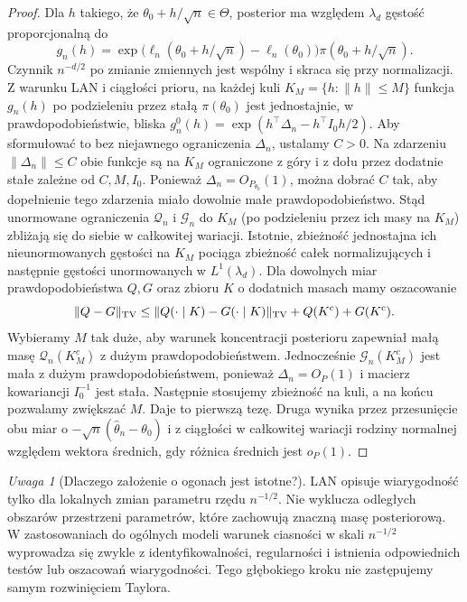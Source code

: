 \documentclass[11pt,a4paper,oneside]{report}
\numberwithin{equation}{chapter}
\theoremstyle{plain}
\theoremstyle{definition}
\theoremstyle{remark}
\newtheorem{uwaga}{Uwaga}[chapter]
\newcommand{\norm}[1]{\lVert#1\rVert}
\begin{document}
\begin{proof}
Dla $h$ takiego, że $\theta_0+h/\sqrt n\in\Theta$,
posterior ma względem $\lambda_d$ gęstość proporcjonalną do
\[
 g_n(h)=\exp\big(\ell_n(\theta_0+h/\sqrt n)-\ell_n(\theta_0)\big)
 \pi(\theta_0+h/\sqrt n).
\]
Czynnik $n^{-d/2}$ po zmianie zmiennych jest wspólny
i skraca się przy normalizacji.
Z warunku LAN i ciągłości prioru, na każdej kuli
$K_M=\{h:\norm h\le M\}$ funkcja $g_n(h)$
po podzieleniu przez stałą $\pi(\theta_0)$ jest
jednostajnie, w prawdopodobieństwie, bliska
$g_n^0(h)=\exp(h^\top\Delta_n-h^\top I_0h/2)$.
Aby sformułować to bez niejawnego ograniczenia $\Delta_n$,
ustalamy $C>0$. Na zdarzeniu $\norm{\Delta_n}\le C$
obie funkcje są na $K_M$ ograniczone z góry i z dołu
przez dodatnie stałe zależne od $C,M,I_0$.
Ponieważ $\Delta_n=O_{P_{\theta_0}}(1)$,
można dobrać $C$ tak, aby dopełnienie tego zdarzenia
miało dowolnie małe prawdopodobieństwo.
Stąd unormowane ograniczenia $\mathcal Q_n$ i $\mathcal G_n$
do $K_M$ (po podzieleniu przez ich masy na $K_M$)
zbliżają się do siebie w całkowitej wariacji.
Istotnie, zbieżność jednostajna ich nieunormowanych
gęstości na $K_M$ pociąga zbieżność całek normalizujących
i następnie gęstości unormowanych w $L^1(\lambda_d)$.
Dla dowolnych miar prawdopodobieństwa $Q,G$ oraz zbioru
$K$ o dodatnich masach mamy oszacowanie
\[
 \norm{Q-G}_{\rm TV}
 \le \norm{Q(\cdot\mid K)-G(\cdot\mid K)}_{\rm TV}
       +Q(K^c)+G(K^c).
\]
Wybieramy $M$ tak duże, aby warunek koncentracji posterioru
zapewniał małą masę $\mathcal Q_n(K_M^c)$ z dużym
prawdopodobieństwem. Jednocześnie
$\mathcal G_n(K_M^c)$ jest mała z dużym prawdopodobieństwem,
ponieważ $\Delta_n=O_P(1)$ i macierz kowariancji
$I_0^{-1}$ jest stała. Następnie stosujemy zbieżność
na kuli, a na końcu pozwalamy zwiększać $M$.
Daje to pierwszą tezę.
Druga wynika przez przesunięcie obu miar o
$-\sqrt n(\widehat\theta_n-\theta_0)$ i z ciągłości
w całkowitej wariacji rodziny normalnej względem wektora
średnich, gdy różnica średnich jest $o_P(1)$.
\end{proof}

\begin{uwaga}[Dlaczego założenie o ogonach jest istotne?]
LAN opisuje wiarygodność tylko dla lokalnych zmian parametru
rzędu $n^{-1/2}$. Nie wyklucza odległych obszarów przestrzeni
parametrów, które zachowują znaczną masę posteriorową.
W zastosowaniach do ogólnych modeli warunek ciasności
w skali $n^{-1/2}$ wyprowadza się zwykle z identyfikowalności,
regularności i istnienia odpowiednich testów lub oszacowań
wiarygodności. Tego głębokiego kroku nie zastępujemy
samym rozwinięciem Taylora.
\end{uwaga}
\end{document}
